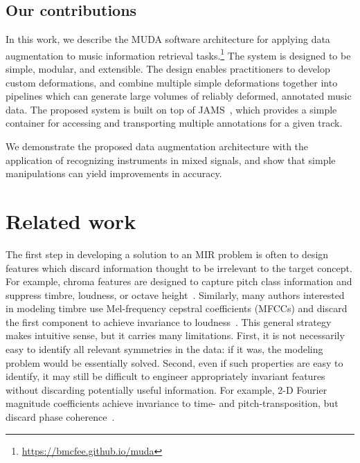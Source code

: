 \documentclass{article}
\begin{document}

\subsection{Our contributions}
In this work, we describe the MUDA software architecture for applying data augmentation to music
information retrieval tasks.\footnote{\url{https://bmcfee.github.io/muda}}
The system is designed to be simple, modular, and
extensible. The design enables practitioners to develop custom deformations, and combine
multiple simple deformations together into pipelines which can generate large volumes of
reliably deformed, annotated music data.  The proposed system is built on top of
JAMS~\cite{humphreyjams}, which provides a simple container for accessing and
transporting multiple annotations for a given track.

We demonstrate the proposed data augmentation architecture with the application
of recognizing instruments in mixed signals, and show that simple
manipulations can yield improvements in accuracy.

\section{Related work}

The first step in developing a solution to an MIR problem is often to
design features which discard information thought to be irrelevant to the target
concept.  For example, chroma features are designed to capture pitch class information
and suppress timbre, loudness, or octave height~\cite{muller2011chroma}.
Similarly, many authors interested in modeling timbre
use Mel-frequency cepstral coefficients (MFCCs) and discard the first component to
achieve invariance to loudness~\cite{pampalk2004matlab}.
This general strategy makes intuitive sense, but it carries many limitations.
First, it is not necessarily easy to identify all relevant symmetries in the
data: if it was, the modeling problem would be essentially solved.
Second, even if such properties are easy to identify, it may still be difficult to
engineer appropriately invariant features without discarding potentially useful
information.  For example, 2-D Fourier magnitude coefficients achieve invariance to
time- and pitch-transposition, but discard phase coherence~\cite{ellis2012large}.
\end{document}
